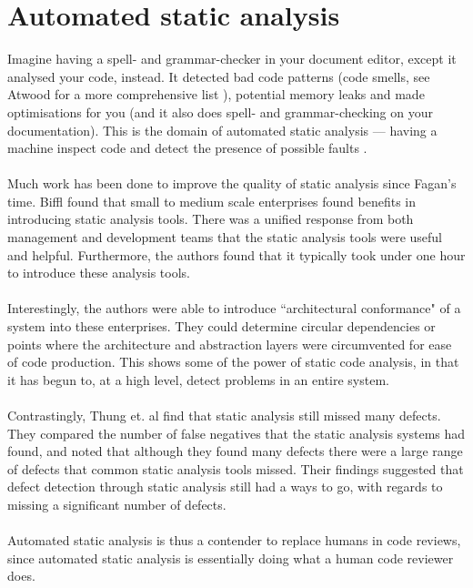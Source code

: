 \section{Automated static analysis} \label{sec:otherdets:static}

Imagine having a spell- and grammar-checker in your document editor, except it analysed your code,
instead.
It detected bad code patterns (code smells, see Atwood for a more comprehensive list
\cite{AtwoodCodeSmells}), potential memory leaks and made optimisations
for you (and it also does spell- and grammar-checking on your documentation).
This is the domain of automated static analysis --- having a machine inspect code and detect the
presence of possible faults \cite{chess2007secure}.\\
\\
Much work has been done to improve the quality of static analysis since Fagan's time.
Biffl \cite{Biffl2012BenefitAutomatedStaticAnalysis} found that small to medium scale enterprises
found benefits in introducing static analysis tools.
There was a unified response from both management and development teams that the static analysis
tools were useful and helpful.
Furthermore, the authors found that it typically took under one hour to
introduce these analysis tools.\\
\\
Interestingly, the authors were able to introduce ``architectural conformance" of a system into
these enterprises.
They could determine circular dependencies or points where the architecture and abstraction layers
were circumvented for ease of code production.
This shows some of the power of static code analysis, in that it has begun to, at a high level,
detect problems in an entire system.\\
\\
Contrastingly, Thung et. al \cite{Thung:2012:EWD:2351676.2351685} find that static analysis still
missed many defects.
They compared the number of false negatives that the static analysis systems had found,
and noted that although they found many defects there were a large range of defects that common
static analysis tools missed.
Their findings suggested that defect detection through static analysis still had a ways to go, with
regards to missing a significant number of defects.\\
\\
Automated static analysis is thus a contender to replace humans in code reviews, since automated
static analysis is essentially doing what a human code reviewer does.
